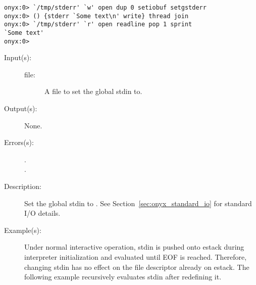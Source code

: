 \begin{description}
\begin{description}
\begin{verbatim}
onyx:0> `/tmp/stderr' `w' open dup 0 setiobuf setgstderr
onyx:0> () {stderr `Some text\n' write} thread join
onyx:0> `/tmp/stderr' `r' open readline pop 1 sprint
`Some text'
onyx:0>
		\end{verbatim}
	\end{description}
\label{systemdict:setgstdin}
\item[{\onyxop{file}{setgstdin}{--}}: ]
	\begin{description}\item[]
	\item[Input(s): ]
		\begin{description}\item[]
		\item[file: ]
			A file to set the global stdin to.
		\end{description}
	\item[Output(s): ] None.
	\item[Errors(s): ]
		\begin{description}\item[]
		\item[.]
		\item[.]
		\end{description}
	\item[Description: ]
		Set the global stdin to .  See
		Section~\ref{sec:onyx_standard_io} for standard I/O details.
	\item[Example(s): ]
		Under normal interactive operation, stdin is pushed onto estack
		during interpreter initialization and evaluated until EOF is
		reached.  Therefore, changing stdin has no effect on the file
		descriptor already on estack.  The following example recursively
		evaluates stdin after redefining it.
\begin{verbatim}


\end{verbatim}
\end{description}
\end{description}
